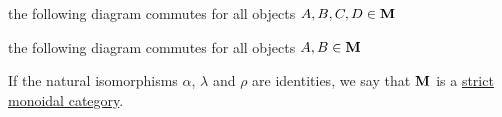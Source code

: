 \begin{definition}
\begin{defenum}
    \item the following diagram commutes for all objects $A, B, C, D \in \operatorname{\mathbf{M}}$
    \begin{Center}
    \end{Center}

    \item the following diagram commutes for all objects $A, B \in \operatorname{\mathbf{M}}$
    \begin{Center}
    \end{Center}
  \end{defenum}

  If the natural isomorphisms $\alpha$, $\lambda$ and $\rho$ are identities, we say that $\operatorname{\mathbf{M}}$ is a \ul{strict monoidal category}.
\end{definition}

